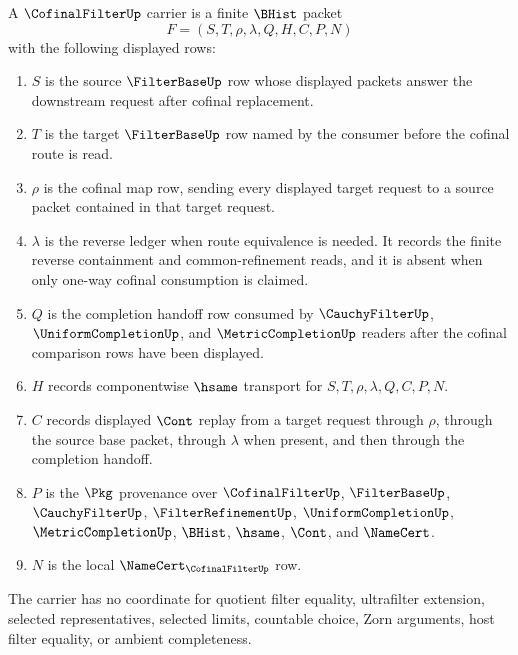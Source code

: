 \begin{definition}
\label{def:cofinal-filter-carrier}
A $\CofinalFilterUp$ carrier is a finite $\BHist$ packet
$$
F=(S,T,\rho,\lambda,Q,H,C,P,N)
$$
with the following displayed rows:
\begin{enumerate}
\item $S$ is the source $\FilterBaseUp$ row whose displayed packets answer the downstream request after cofinal replacement.
\item $T$ is the target $\FilterBaseUp$ row named by the consumer before the cofinal route is read.
\item $\rho$ is the cofinal map row, sending every displayed target request to a source packet contained in that target request.
\item $\lambda$ is the reverse ledger when route equivalence is needed. It records the finite reverse containment and common-refinement reads, and it is absent when only one-way cofinal consumption is claimed.
\item $Q$ is the completion handoff row consumed by $\CauchyFilterUp$, $\UniformCompletionUp$, and $\MetricCompletionUp$ readers after the cofinal comparison rows have been displayed.
\item $H$ records componentwise $\hsame$ transport for $S,T,\rho,\lambda,Q,C,P,N$.
\item $C$ records displayed $\Cont$ replay from a target request through $\rho$, through the source base packet, through $\lambda$ when present, and then through the completion handoff.
\item $P$ is the $\Pkg$ provenance over $\CofinalFilterUp$, $\FilterBaseUp$, $\CauchyFilterUp$, $\FilterRefinementUp$, $\UniformCompletionUp$, $\MetricCompletionUp$, $\BHist$, $\hsame$, $\Cont$, and $\NameCert$.
\item $N$ is the local $\NameCert_{\CofinalFilterUp}$ row.
\end{enumerate}
The carrier has no coordinate for quotient filter equality, ultrafilter extension, selected representatives, selected limits, countable choice, Zorn arguments, host filter equality, or ambient completeness.
\end{definition}


